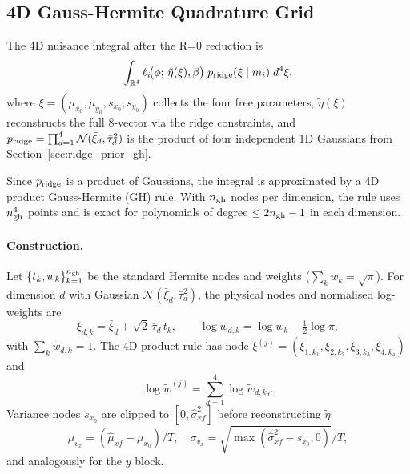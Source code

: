 \documentclass[11pt,a4paper]{article}
\begin{document}
\subsection{4D Gauss-Hermite Quadrature Grid}
\label{sec:gh_grid}

The 4D nuisance integral after the R=0 reduction is
\begin{equation}
  \int_{\mathbb{R}^4}
    \ell_i\!\bigl(\phi;\,\tilde\eta(\xi),\beta\bigr)\;
    p_{\rm ridge}(\xi\mid m_i)\;d^4\xi,
  \label{eq:ridge_int}
\end{equation}
where $\xi=(\mu_{x_0},\mu_{y_0},s_{x_0},s_{y_0})$ collects the four free
parameters, $\tilde\eta(\xi)$ reconstructs the full 8-vector via the ridge
constraints, and $p_{\rm ridge}=\prod_{d=1}^4\mathcal{N}(\bar\xi_d,\bar\tau_d^2)$
is the product of four independent 1D Gaussians from
Section~\ref{sec:ridge_prior_gh}.

Since $p_{\rm ridge}$ is a product of Gaussians, the integral is approximated
by a 4D product Gauss-Hermite (GH) rule.  With $n_{\rm gh}$ nodes per
dimension, the rule uses $n_{\rm gh}^4$ points and is exact for polynomials
of degree $\le2n_{\rm gh}-1$ in each dimension.

\paragraph{Construction.}
Let $\{t_k,w_k\}_{k=1}^{n_{\rm gh}}$ be the standard Hermite nodes and
weights ($\sum_k w_k=\sqrt{\pi}$).  For dimension $d$ with Gaussian
$\mathcal{N}(\bar\xi_d,\bar\tau_d^2)$, the physical nodes and normalised
log-weights are
\begin{equation}
  \xi_{d,k}=\bar\xi_d+\sqrt{2}\,\bar\tau_d\,t_k,
  \qquad
  \log\tilde w_{d,k}=\log w_k-\tfrac{1}{2}\log\pi,
  \label{eq:gh_nodes}
\end{equation}
with $\sum_k\tilde w_{d,k}=1$.  The 4D product rule has node
$\xi^{(j)}=(\xi_{1,k_1},\xi_{2,k_2},\xi_{3,k_3},\xi_{4,k_4})$ and
\begin{equation}
  \log\tilde w^{(j)}
  =\sum_{d=1}^4\log\tilde w_{d,k_d}.
  \label{eq:gh_logw}
\end{equation}
Variance nodes $s_{x_0}$ are clipped to $[0,\hat\sigma^2_{xf}]$ before
reconstructing $\tilde\eta$:
\begin{equation}
  \mu_{v_x}=(\hat\mu_{xf}-\mu_{x_0})/T,\quad
  \sigma_{v_x}=\sqrt{\max(\hat\sigma^2_{xf}-s_{x_0},0)}/T,
  \label{eq:eta_reconstruct}
\end{equation}
and analogously for the $y$ block.
\end{document}

